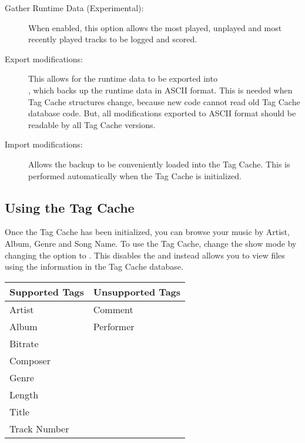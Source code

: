\begin{description}
\item[Gather Runtime Data (Experimental):  ]
  When enabled, this option allows the most played, unplayed and most recently
  played tracks to be logged and scored.
  
\item[Export modifications:  ]
  This allows for the runtime data to be exported into \\
  , which backs up the runtime data in
  ASCII format. This is needed when Tag Cache structures change, because new 
  code cannot read old Tag Cache database code.  But, all modifications 
  exported to ASCII format should be readable by all Tag Cache versions.
  
\item[Import modifications:  ]
  Allows the  backup to be 
  conveniently loaded into the Tag Cache. This is performed automatically when
  the Tag Cache is initialized.
  
\end{description}

\subsection{Using the Tag Cache}
Once the Tag Cache has been initialized, you can browse your music by Artist, 
Album, Genre and Song Name.  To use the Tag Cache, change the 
 show mode by changing the  option to 
.  This disables the  and instead
allows you to view files using the information in the Tag Cache database.\\

%
\begin{table}
\begin{center}
  \begin{tabularx}{.75\textwidth}{XX}
  \toprule
  Supported Tags   & Unsupported Tags \\ 
  \midrule
  Artist           & Comment \\
  Album            & Performer\\
  Bitrate          & \\
  Composer         & \\
  Genre            & \\
  Length           & \\
  Title            & \\
  Track Number     & \\
  \bottomrule
  \end{tabularx}
\end{center}
\end{table}

